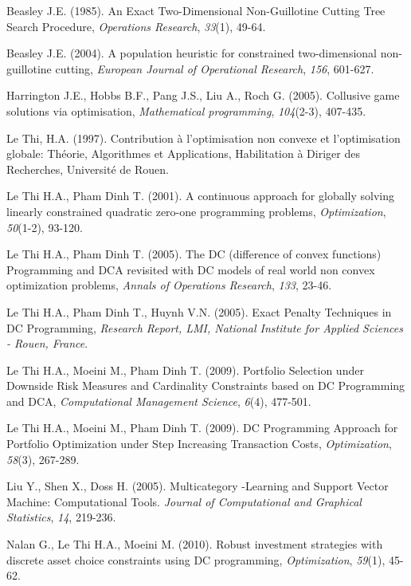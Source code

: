 \documentclass{iesmart}
\begin{document}
\begin{thebibliography}{99}     

Beasley J.E. (1985). An Exact Two-Dimensional Non-Guillotine
Cutting Tree Search Procedure, \emph{Operations Research},
\emph{33}(1), 49-64.


Beasley J.E. (2004). A population heuristic for constrained
two-dimensional non-guillotine cutting, \emph{European Journal of
Operational Research}, \emph{156}, 601-627.


Harrington J.E., Hobbs B.F., Pang J.S., Liu A., Roch G. (2005).
Collusive game solutions via optimisation, \emph{Mathematical
programming}, \emph{104}(2-3), 407-435.


Le Thi, H.A. (1997). Contribution \`{a} l'optimisation non convexe
et l'optimisation globale: Th\'{e}orie, Algorithmes et
Applications, Habilitation \`{a} Diriger des Recherches,
Universit\'{e} de Rouen.


Le Thi H.A., Pham Dinh T. (2001). A continuous approach for
globally solving linearly constrained quadratic zero-one
programming problems, \emph{Optimization}, \emph{50}(1-2), 93-120.


Le Thi H.A., Pham Dinh T. (2005). The DC (difference of convex
functions) Programming and DCA revisited with DC models of real
world non convex optimization problems, \emph{Annals of Operations
Research}, \emph{133}, 23-46.


 Le Thi H.A., Pham Dinh T., Huynh V.N. (2005).
Exact Penalty Techniques in DC Programming, \emph{Research Report,
LMI, National Institute for Applied Sciences - Rouen, France}.


Le Thi H.A., Moeini M., Pham Dinh T. (2009). Portfolio Selection
under Downside Risk Measures and Cardinality Constraints based on
DC Programming and DCA, \emph{Computational Management Science},
\emph{6}(4), 477-501.


Le Thi H.A., Moeini M., Pham Dinh T. (2009). DC Programming
Approach for Portfolio Optimization under Step Increasing
Transaction Costs, \emph{Optimization}, \emph{58}(3), 267-289.


Liu Y., Shen X., Doss H. (2005). Multicategory -Learning and
Support Vector Machine: Computational Tools. \emph{Journal of
Computational and Graphical Statistics}, \emph{14}, 219-236.


Nalan G., Le Thi H.A., Moeini M. (2010). Robust investment
strategies with discrete asset choice constraints using DC
programming, \emph{Optimization}, \emph{59}(1), 45-62.



\end{thebibliography}
\end{document}
